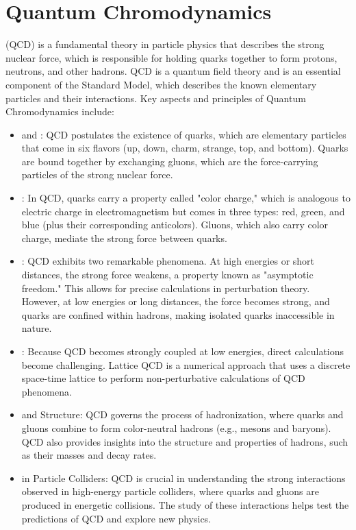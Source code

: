 \chapter{Quantum Chromodynamics}
\thispagestyle{fancy}


 (QCD) is a fundamental theory in particle physics that describes the strong nuclear force, which is responsible for holding quarks together to form protons, neutrons, and other hadrons. QCD is a quantum field theory and is an essential component of the Standard Model, which describes the known elementary particles and their interactions. Key aspects and principles of Quantum Chromodynamics include:

\begin{itemize}
	\item {} and : QCD postulates the existence of quarks, which are elementary particles that come in six flavors (up, down, charm, strange, top, and bottom). Quarks are bound together by exchanging gluons, which are the force-carrying particles of the strong nuclear force.

	\item {}: In QCD, quarks carry a property called "color charge," which is analogous to electric charge in electromagnetism but comes in three types: red, green, and blue (plus their corresponding anticolors). Gluons, which also carry color charge, mediate the strong force between quarks.

	\item {}: QCD exhibits two remarkable phenomena. At high energies or short distances, the strong force weakens, a property known as "asymptotic freedom." This allows for precise calculations in perturbation theory. However, at low energies or long distances, the force becomes strong, and quarks are confined within hadrons, making isolated quarks inaccessible in nature.

	\item {}: Because QCD becomes strongly coupled at low energies, direct calculations become challenging. Lattice QCD is a numerical approach that uses a discrete space-time lattice to perform non-perturbative calculations of QCD phenomena.

	\item {} and  Structure: QCD governs the process of hadronization, where quarks and gluons combine to form color-neutral hadrons (e.g., mesons and baryons). QCD also provides insights into the structure and properties of hadrons, such as their masses and decay rates.

	\item {} in Particle Colliders: QCD is crucial in understanding the strong interactions observed in high-energy particle colliders, where quarks and gluons are produced in energetic collisions. The study of these interactions helps test the predictions of QCD and explore new physics.
\end{itemize}

